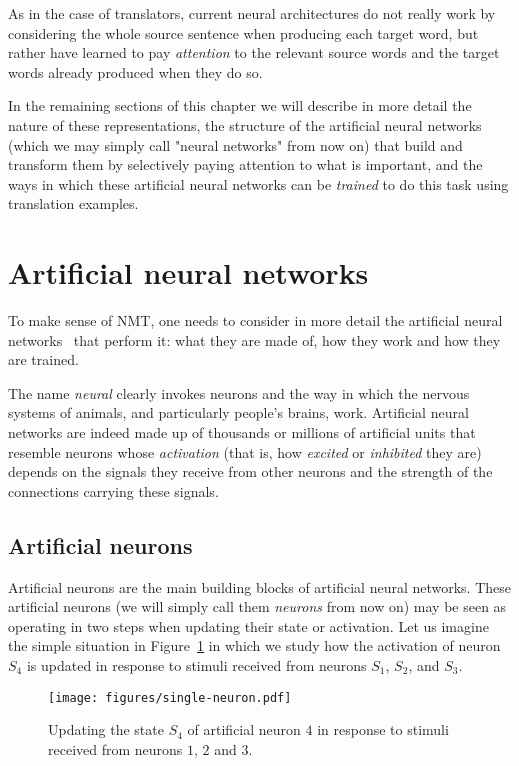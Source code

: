 \documentclass[output=paper,colorlinks,citecolor=brown]{langscibook}
\begin{document}
As in the case of translators, current neural architectures do not really work by considering the whole source sentence when producing each target word, but rather have learned to pay \emph{attention} to the relevant source words and the target words already produced when they do so.

In the remaining sections of this chapter we will describe in more detail the nature of these representations, the structure of the artificial neural networks (which we may simply call "neural networks" from now on) that build and transform them by selectively paying attention to what is important, and the ways in which these artificial neural networks can be \emph{trained} to do this task using translation examples.

\section{Artificial neural networks}

To make sense of NMT, one needs to consider in more detail the artificial neural networks~ \citep{deeplearningbook} that perform it: what they are made of, how they work and how they are trained. 

The name \emph{neural} clearly invokes neurons and the way in which the nervous systems of animals, and particularly people's 
brains,
work. Artificial neural networks are indeed made up of thousands or millions of artificial units that resemble neurons whose \emph{activation} (that is, how
\emph{excited} or \emph{inhibited} 
they are) depends on the signals they receive from other neurons and the strength of the connections carrying these signals. 

\subsection{Artificial neurons}
\begin{sloppypar}
Artificial neurons are the main building blocks of artificial neural networks. 
These artificial neurons (we will simply call them \emph{neurons} from now on) may be seen as operating in two steps when updating their state or activation. Let us imagine the simple situation in Figure~\ref{fg:neuron} in which we study how the activation of neuron $S_4$ is updated in response to stimuli received from neurons $S_1$, $S_2$, and $S_3$.
\end{sloppypar}

\begin{figure}
    \texttt{[image: figures/single-neuron.pdf]}  
    \caption{Updating the state $S_4$ of artificial neuron $4$ in response to stimuli received from neurons $1$, $2$ and $3$.}
    \label{fg:neuron}
\end{figure}
\end{document}
